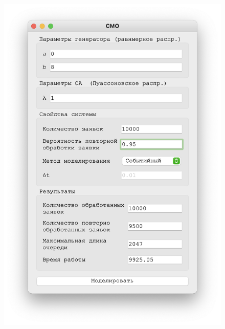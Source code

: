  \begin{figure}[!htb]
    \begin{minipage}{0.55\textwidth}
      \centering
      \includegraphics[width=1\linewidth]{1-95-s}
    \end{minipage}\hfill
    \begin{minipage}{0.55\textwidth}
      \centering

\end{minipage}
\end{figure}
